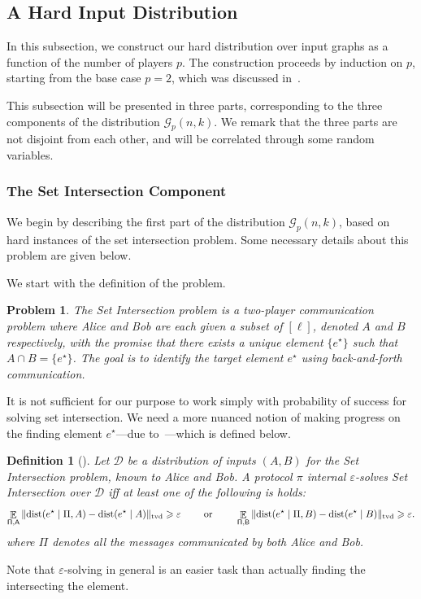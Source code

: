 \documentclass[11pt]{article}
\newtheorem{definition}[lemma]{Definition}
\newtheorem{problem}{Problem}
\theoremstyle{definition}
\renewcommand{\geq}{\geqslant}
\newcommand{\tvd}[2]{\ensuremath{\norm{#1 - #2}_{\mathrm{tvd}}}}
\newcommand{\eps}{\ensuremath{\varepsilon}}
\newcommand{\norm}[1]{\ensuremath{\|#1\|}}
\DeclareMathOperator*{\Exp}{\ensuremath{{\mathbb{E}}}}
\newcommand{\rv}[1]{\ensuremath{{\mathsf{#1}}}\xspace}
\newcommand{\rA}{\rv{A}}
\newcommand{\rB}{\rv{B}}
\newcommand{\distribution}[1]{\ensuremath{\textnormal{dist}(#1)}\xspace}
\newcommand{\cG}{\ensuremath{\mathcal{G}}}
\newcommand{\cD}{\ensuremath{\mathcal{D}}}
\newcommand{\prot}{\ensuremath{\pi}}
\newcommand{\estar}{\ensuremath{e^{\star}}}
\newcommand{\Prot}{\ensuremath{\Pi}}
\newcommand{\rProt}{\ensuremath{\rv{\Prot}}}
\begin{document}
	
	\subsection{A Hard Input Distribution}\label{subsec:adv-construct}

	In this subsection, we construct our hard distribution over input graphs as a function of the number of players $p$. The construction proceeds by induction on $p$, starting from the base case $p = 2$, which was discussed in~.


	This subsection will be presented in three parts, corresponding to the three components of the distribution $\cG_p(n,k)$. We remark that the three parts are not disjoint from each other, and will be correlated through some random variables. 
	
	\subsubsection{The Set Intersection Component}
	
	We begin by describing the first part of the distribution $\cG_p(n,k)$, based on hard instances of the set intersection problem.
	Some necessary details about this problem are given below. 

	We start with the definition of the problem. 

	\begin{problem}\label{def:set-intersect}
	The \textit{Set Intersection} problem is a two-player communication problem where Alice and Bob are each given a subset of $[\ell]$, denoted $A$ and $B$ respectively, with the promise that there exists a unique element $\{\estar\}$ such that $A \cap B = \{\estar\}$. The goal is to identify the target element $\estar$ using back-and-forth communication.
	\end{problem}
	
	It is not sufficient for our purpose to work simply with probability of success for solving set intersection. We need a more nuanced notion of making progress on the finding element $\estar$---due to~\cite{AssadiCK19b,AssadiR20}---which is defined below. 
	
	\begin{definition}[\!\!\cite{AssadiCK19b,AssadiR20}]\label{def:solve-epsilon-SI}
		Let $\cD$ be a distribution of inputs $(A, B)$ for the Set Intersection problem, known to Alice and Bob. A protocol $\prot$ internal $\eps$-solves Set Intersection over $\cD$ iff at least one of the following is holds:
		\[
		\Exp_{\rProt, \rA} \tvd{\distribution{\estar \mid \Prot, A}}{\distribution{\estar \mid A}} \geq \eps \qquad \textnormal{ or } \qquad \Exp_{\rProt, \rB} \tvd{\distribution{\estar \mid \Prot, B}}{\distribution{\estar \mid B}} \geq \eps.
		\]
		where $\Prot$ denotes all the messages communicated by both Alice and Bob.
	\end{definition}	
	\noindent
	Note that $\eps$-solving in general is an easier task than actually finding the intersecting the element. 
	
\end{document}
